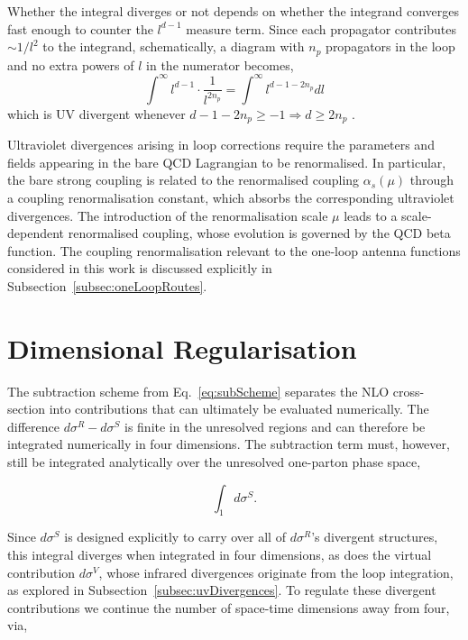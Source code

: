 Whether the integral diverges or not depends on whether the integrand converges
fast enough to counter the $l^{d-1}$ measure term. Since each propagator contributes
$\sim1/l^2$ to the integrand, schematically, a diagram with $n_p$ propagators in the
loop and no extra powers of $l$ in the numerator becomes,
\begin{equation}
    \int^\infty l^{d-1}\cdot\frac{1}{l^{2n_p}}=\int^\infty l^{d-1-2n_p}dl
\end{equation}
which is UV divergent whenever $d-1-2n_p\geq-1\Rightarrow d\geq 2n_p$ 
\cite{Schwartz:2014sze, Peskin:1995ev}.

Ultraviolet divergences arising in loop corrections require the parameters and
fields appearing in the bare QCD Lagrangian to be renormalised. In particular, the
bare strong coupling is related to the renormalised coupling $\alpha_s(\mu)$
through a coupling renormalisation constant, which absorbs the corresponding
ultraviolet divergences. The introduction of the renormalisation scale $\mu$ leads
to a scale-dependent renormalised coupling, whose evolution is governed by the QCD
beta function. The coupling renormalisation relevant to the one-loop antenna
functions considered in this work is discussed explicitly in
Subsection~\ref{subsec:oneLoopRoutes}.

\section{Dimensional Regularisation}\label{sec:dimreg}

The subtraction scheme from Eq.~\eqref{eq:subScheme} separates the NLO cross-section
into contributions that can ultimately be evaluated numerically. The difference
$d\sigma^R-d\sigma^S$ is finite in the unresolved regions and can therefore be
integrated numerically in four dimensions. The subtraction term must, however, still
be integrated analytically over the unresolved one-parton phase space,

\begin{equation}
    \int_1d\sigma^S.
\end{equation}

Since $d\sigma^S$ is designed explicitly to carry over all of $d\sigma^R$'s divergent
structures, this integral diverges when integrated in four dimensions, as does
the virtual contribution $d\sigma^V$, whose infrared divergences originate from the
loop integration, as explored in Subsection~\ref{subsec:uvDivergences}.
To regulate these divergent contributions we continue the number of space-time
dimensions away from four, via,

